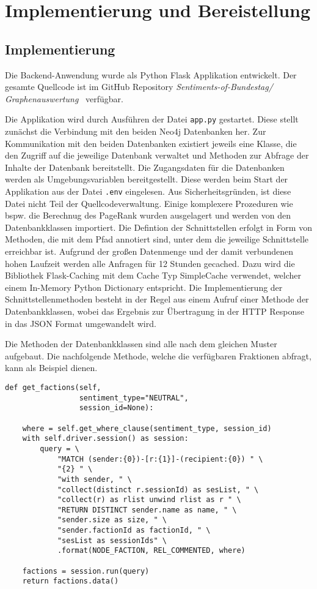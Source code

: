 \section{Implementierung und Bereistellung}

\subsection{Implementierung}
Die Backend-Anwendung wurde als Python Flask Applikation entwickelt. Der gesamte Quellcode ist im GitHub Repository \textit{Sentiments-of-Bundestag/ Graphenauswertung}~\cite{github_graphenauswertung} verfügbar.

Die Applikation wird durch Ausführen der Datei \lstinline{app.py} gestartet.
Diese stellt zunächst die Verbindung mit den beiden Neo4j Datenbanken her.
Zur Kommunikation mit den beiden Datenbanken existiert jeweils eine Klasse, die den Zugriff auf die jeweilige Datenbank verwaltet und Methoden zur Abfrage der Inhalte der Datenbank bereitstellt.
Die Zugangsdaten für die Datenbanken werden als Umgebungsvariablen bereitgestellt. Diese werden beim Start der Applikation aus der Datei \lstinline{.env} eingelesen.
Aus Sicherheitsgründen, ist diese Datei nicht Teil der Quellcodeverwaltung.
Einige komplexere Prozeduren wie bspw. die Berechnug des PageRank wurden ausgelagert und werden von den Datenbankklassen importiert.
Die Defintion der Schnittstellen erfolgt in Form von Methoden, die mit dem Pfad annotiert sind, unter dem die jeweilige Schnittstelle erreichbar ist.
Aufgrund der großen Datenmenge und der damit verbundenen hohen Laufzeit werden alle Anfragen für 12 Stunden gecached.
Dazu wird die Bibliothek Flask-Caching mit dem Cache Typ SimpleCache verwendet, welcher einem In-Memory Python Dictionary entspricht.\cite{flask_caching}
Die Implementierung der Schnittstellenmethoden besteht in der Regel aus einem Aufruf einer Methode der Datenbankklassen, wobei das Ergebnis zur Übertragung in der HTTP Response in das JSON Format umgewandelt wird.

Die Methoden der Datenbankklassen sind alle nach dem gleichen Muster aufgebaut.
Die nachfolgende Methode, welche die verfügbaren Fraktionen abfragt, kann als Beispiel dienen.

\begin{lstlisting}
def get_factions(self,
                 sentiment_type="NEUTRAL",
                 session_id=None):

    where = self.get_where_clause(sentiment_type, session_id)
    with self.driver.session() as session:
        query = \
            "MATCH (sender:{0})-[r:{1}]-(recipient:{0}) " \
            "{2} " \
            "with sender, " \
            "collect(distinct r.sessionId) as sesList, " \
            "collect(r) as rlist unwind rlist as r " \
            "RETURN DISTINCT sender.name as name, " \
            "sender.size as size, " \
            "sender.factionId as factionId, " \
            "sesList as sessionIds" \
            .format(NODE_FACTION, REL_COMMENTED, where)

    factions = session.run(query)
    return factions.data()
\end{lstlisting}

